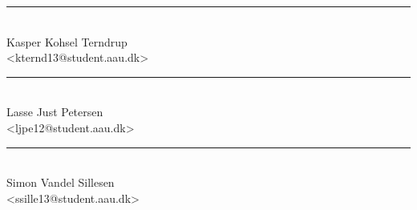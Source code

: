 \noindent
\begin{minipage}[b]{0.45\textwidth}
 \centering
 \rule{\textwidth}{0.5pt}\\
  Kasper Kohsel Terndrup\\
 {\footnotesize <kternd13@student.aau.dk>}
\end{minipage}
%
\hfill
%
\begin{minipage}[b]{0.45\textwidth}
 \centering
 \rule{\textwidth}{0.5pt}\\
  Lasse Just Petersen\\
 {\footnotesize <ljpe12@student.aau.dk>}
\end{minipage}
\vspace{3\baselineskip}

\noindent
\begin{center}
\begin{minipage}[b]{0.45\textwidth}
 \centering
 \rule{\textwidth}{0.5pt}\\
  Simon Vandel Sillesen\\
 {\footnotesize <ssille13@student.aau.dk>}
\end{minipage}
\end{center}
%
\hfill
%